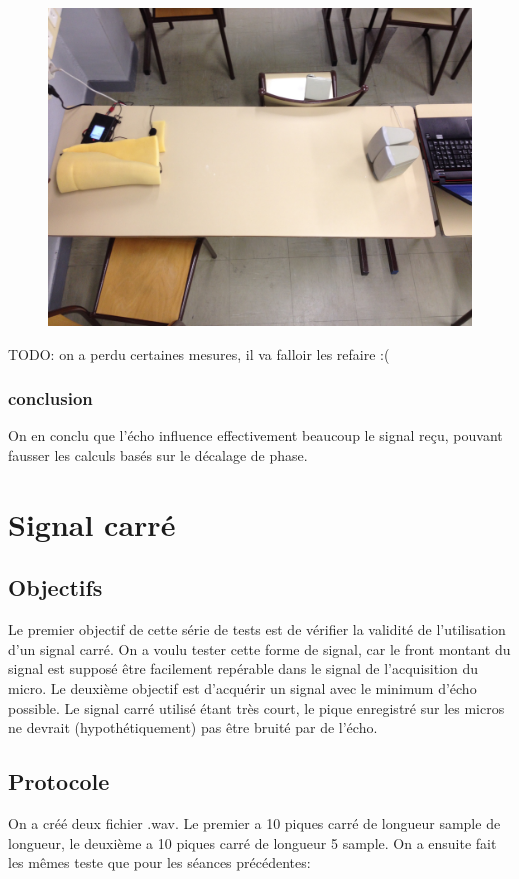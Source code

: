 \documentclass[12pt,a4paper]{report}
\begin{document}
\begin{figure}[H]
\includegraphics[width=\textwidth]{../tests/test_du_protocole/IMG_0924.jpg} 
\end{figure}

TODO: on a perdu certaines mesures, il va falloir les refaire :(

\subsection{conclusion}
On en conclu que l'écho influence effectivement beaucoup le signal reçu, pouvant fausser les calculs basés sur le décalage de phase.

\chapter{Signal carré}
\section{Objectifs}
	Le premier objectif de cette série de tests est de vérifier la validité de l'utilisation d'un signal carré.
	On a voulu tester cette forme de signal, car le front montant du signal est supposé être facilement repérable dans le signal de l'acquisition du micro.
	Le deuxième objectif est d'acquérir un signal avec le minimum d'écho possible. Le signal carré utilisé étant très court, le pique enregistré sur les micros ne devrait (hypothétiquement) pas être bruité par de l'écho.

\section{Protocole}
	On a créé deux fichier .wav. Le premier a 10 piques carré de longueur sample de longueur, le deuxième a 10 piques carré de longueur 5 sample.
	On a ensuite fait les mêmes teste que pour les séances précédentes:
\end{document}
